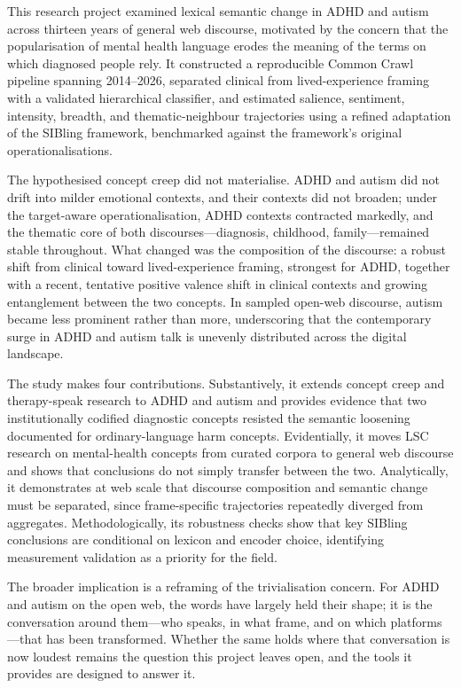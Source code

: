 This research project examined lexical semantic change in ADHD and autism across thirteen years of general web discourse, motivated by the concern that the popularisation of mental health language erodes the meaning of the terms on which diagnosed people rely. It constructed a reproducible Common Crawl pipeline spanning 2014--2026, separated clinical from lived-experience framing with a validated hierarchical classifier, and estimated salience, sentiment, intensity, breadth, and thematic-neighbour trajectories using a refined adaptation of the SIBling framework, benchmarked against the framework's original operationalisations.

The hypothesised concept creep did not materialise. ADHD and autism did not drift into milder emotional contexts, and their contexts did not broaden; under the target-aware operationalisation, ADHD contexts contracted markedly, and the thematic core of both discourses---diagnosis, childhood, family---remained stable throughout. What changed was the composition of the discourse: a robust shift from clinical toward lived-experience framing, strongest for ADHD, together with a recent, tentative positive valence shift in clinical contexts and growing entanglement between the two concepts. In sampled open-web discourse, autism became less prominent rather than more, underscoring that the contemporary surge in ADHD and autism talk is unevenly distributed across the digital landscape.

The study makes four contributions. Substantively, it extends concept creep and therapy-speak research to ADHD and autism and provides evidence that two institutionally codified diagnostic concepts resisted the semantic loosening documented for ordinary-language harm concepts. Evidentially, it moves LSC research on mental-health concepts from curated corpora to general web discourse and shows that conclusions do not simply transfer between the two. Analytically, it demonstrates at web scale that discourse composition and semantic change must be separated, since frame-specific trajectories repeatedly diverged from aggregates. Methodologically, its robustness checks show that key SIBling conclusions are conditional on lexicon and encoder choice, identifying measurement validation as a priority for the field.

The broader implication is a reframing of the trivialisation concern. For ADHD and autism on the open web, the words have largely held their shape; it is the conversation around them---who speaks, in what frame, and on which platforms---that has been transformed. Whether the same holds where that conversation is now loudest remains the question this project leaves open, and the tools it provides are designed to answer it.
